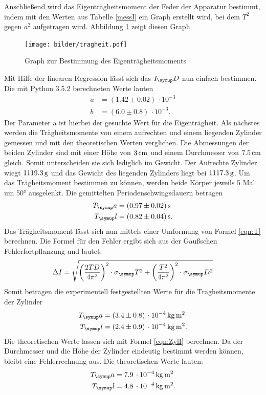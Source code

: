 Anschließend wird das Eigenträgheitsmoment der Feder der Apparatur bestimmt,
indem mit den Werten aus Tabelle \ref{messI} ein Graph erstellt wird, bei dem
$T^2$ gegen $a^2$ aufgetragen wird. Abbildung \ref{fig:trag} zeigt diesen Graph.
\begin{figure}[H]
  \centering
  \texttt{[image: bilder/tragheit.pdf]}
  \caption{Graph zur Bestimmung des Eigenträgheitsmoments}
  \label{fig:trag}
\end{figure}
Mit Hilfe der linearen Regression lässt sich das $I_\su{D}$ nun einfach bestimmen.
Die mit Python 3.5.2 berechneten Werte lauten
\begin{align*}
  a &= (1.42 \pm 0.02)\,\cdot10^{-3} \\
  b &= (6.0 \pm 0.8)\,\cdot10^{-3}.
\end{align*}
Der Parameter a ist hierbei der gesuchte Wert für die Eigenträgheit.
Als nächstes werden die Trägheitsmomente von einem aufrechten und einem liegenden
Zylinder gemessen und mit den theoretischen Werten verglichen. Die Abmessungen
der beiden Zylinder sind mit einer Höhe von $3\,\si{\centi\meter}$ und einem Durchmesser von $7.5\,\si{\centi\meter}$
gleich. Somit unterscheiden sie sich lediglich im Gewicht. Der Aufrechte Zylinder
wiegt $1119.3\,\si{\gram}$ und das Gewicht des liegenden Zylinders liegt bei $1117.3\,\si{\gram}$.
Um das Trägheitsmoment bestimmen zu können, werden beide Körper jeweils 5 Mal um
50° ausgelenkt. Die gemittelten Periodenschwingsdauern betragen
\begin{align*}
  T_\su{a} &= (0.97 \pm 0.02)\sek \\
  T_\su{l} &= (0.82 \pm 0.04)\sek.
\end{align*}
Das Trägheitsmoment lässt sich nun mittels einer Umformung von Formel \eqref{eqn:T}
berechnen. Die Formel für den Fehler ergibt sich aus der Gaußschen Fehlerfortpflanzung
und lautet:
\begin{equation*}
  \Delta I = \sqrt{\biggl(\frac{2TD}{4\pi^2}\biggr)^2\cdot\sigma_\su{T}^2 +
  \biggl(\frac{T^2}{4\pi^2}\biggr)^2\cdot\sigma_\su{D}^2}
\end{equation*}
Somit betragen die experimentell festgestellten Werte für die Trägheitsmomente
der Zylinder
\begin{align*}
  T_\su{a} &= (3.4 \pm 0.8)\,\cdot10^{-4}\,\si{\kilo\gram\square\meter} \\
  T_\su{l} &= (2.4 \pm 0.9)\,\cdot10^{-4}\,\si{\kilo\gram\square\meter}.
\end{align*}
Die theoretischen Werte lassen sich mit Formel \eqref{eqn:ZylI} berechnen.
Da der Durchmesser und die Höhe der Zylinder eindeutig bestimmt werden können,
bleibt eine Fehlerrechnung aus.
Die theoretischen Werte lauten:
\begin{align}
  T_\su{a} &= 7.9\,\cdot10^{-4}\,\si{\kilo\gram\square\meter} \\
  T_\su{l} &= 4.8\,\cdot10^{-4}\,\si{\kilo\gram\square\meter}.
\end{align}

